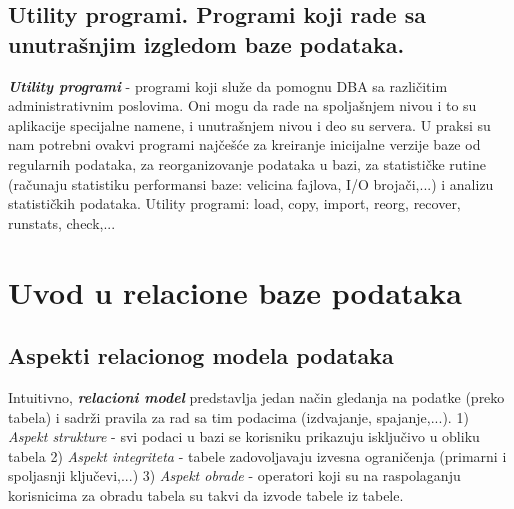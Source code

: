 \documentclass{article}
\begin{document}
\subsection{Utility programi. Programi koji rade sa unutrašnjim izgledom
baze podataka.}
\textbf{\textit{Utility programi}} - programi koji služe da pomognu DBA sa
različitim administrativnim poslovima. Oni mogu da rade na spoljašnjem
nivou i to su aplikacije specijalne namene, i unutrašnjem nivou i deo su
servera. U praksi su nam potrebni ovakvi programi najčešće
za kreiranje inicijalne verzije baze od regularnih podataka, za
reorganizovanje podataka u bazi, za statističke rutine (računaju statistiku
performansi baze: velicina fajlova, I/O brojači,...) i analizu statističkih podataka.
\newline
Utility programi: load, copy, import, reorg, recover, runstats, check,...

\newpage

\section{Uvod u relacione baze podataka}
\subsection{Aspekti relacionog modela podataka}
Intuitivno, \textbf{\textit{relacioni model}} predstavlja jedan način
gledanja na podatke (preko tabela) i sadrži pravila za rad sa 
tim podacima
(izdvajanje, spajanje,...).
\newline \hspace*{0.2cm}
1) \textit{Aspekt strukture} - svi podaci u bazi se korisniku prikazuju
isključivo u obliku tabela
\newline \hspace*{0.2cm}
2) \textit{Aspekt integriteta} - tabele zadovoljavaju izvesna ograničenja
(primarni i spoljasnji ključevi,...)
\newline \hspace*{0.2cm}
3) \textit{Aspekt obrade} - operatori koji su na raspolaganju korisnicima
za obradu tabela su takvi da izvode tabele iz tabele.
\end{document}
